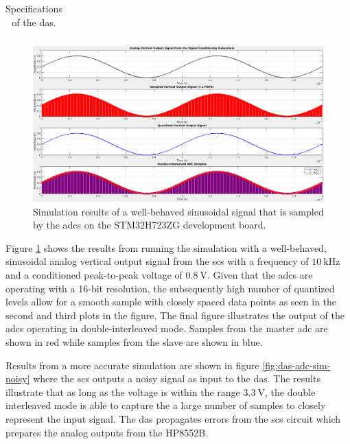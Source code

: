 \documentclass[class=report,11pt,crop=false]{standalone}
\begin{document}
	\begin{table}[ht!]
		\centering
		\label{tab:das-matlab-sim-specs}
		\caption{Specifications of the \acrshort{das}.}
		\begin{tabular}{ccc}
			
		\end{tabular}
	\end{table}
	
	\begin{figure}[h!]
		\centering
		\includegraphics[width=0.70\linewidth]{Figures/Methodology/das-adc-sim}
		\caption{Simulation results of a well-behaved sinusoidal signal that is sampled by the \acrshort{adc}s on the STM32H723ZG development board.}
		\label{fig:das-matlab-sim}
	\end{figure} 
	
	Figure \ref{fig:das-matlab-sim} shows the results from running the simulation with a well-behaved, sinusoidal analog vertical output signal from the \acrshort{scs} with a frequency of $\SI{10}{\kilo\hertz}$ and a conditioned peak-to-peak voltage of $\SI{0.8}{\volt}$. Given that the \acrshort{adc}s are operating with a 16-bit resolution, the subsequently high number of quantized levels allow for a smooth sample with closely spaced data points as seen in the second and third plots in the figure. The final figure illustrates the output of the \acrshort{adc}s operating in double-interleaved mode. Samples from the master \acrshort{adc} are shown in red while samples from the slave are shown in blue. 
	
	Results from a more accurate simulation are shown in figure \ref{fig:das-adc-sim-noisy} where the \acrshort{scs} outputs a noisy signal as input to the \acrshort{das}. The results illustrate that as long as the voltage is within the range $\SI{3.3}{\volt}$, the double interleaved mode is able to capture the a large number of samples to closely represent the input signal. The \acrshort{das} propagates errors from the \acrshort{scs} circuit which prepares the analog outputs from the HP8552B. 
	
\end{document}
